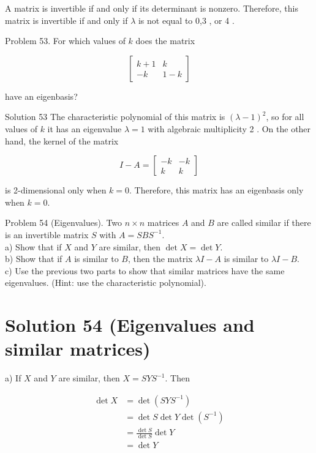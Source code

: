 \documentclass[10pt]{article}
\begin{document}
A matrix is invertible if and only if its determinant is nonzero. Therefore, this matrix is invertible if and only if $\lambda$ is not equal to 0,3 , or 4 .

Problem 53. For which values of $k$ does the matrix

$$
\left[\begin{array}{cc}
k+1 & k \\
-k & 1-k
\end{array}\right]
$$

have an eigenbasis?

Solution 53 The characteristic polynomial of this matrix is $(\lambda-1)^{2}$, so for all values of $k$ it has an eigenvalue $\lambda=1$ with algebraic multiplicity 2 . On the other hand, the kernel of the matrix

$$
I-A=\left[\begin{array}{cc}
-k & -k \\
k & k
\end{array}\right]
$$

is 2-dimensional only when $k=0$. Therefore, this matrix has an eigenbasis only when $k=0$.

Problem 54 (Eigenvalues). Two $n \times n$ matrices $A$ and $B$ are called similar if there is an invertible matrix $S$ with $A=S B S^{-1}$.\\
a) Show that if $X$ and $Y$ are similar, then $\operatorname{det} X=\operatorname{det} Y$.\\
b) Show that if $A$ is similar to $B$, then the matrix $\lambda I-A$ is similar to $\lambda I-B$.\\
c) Use the previous two parts to show that similar matrices have the same eigenvalues. (Hint: use the characteristic polynomial).

\section*{Solution 54 (Eigenvalues and similar matrices)}
a) If $X$ and $Y$ are similar, then $X=S Y S^{-1}$. Then

$$
\begin{aligned}
\operatorname{det} X & =\operatorname{det}\left(S Y S^{-1}\right) \\
& =\operatorname{det} S \operatorname{det} Y \operatorname{det}\left(S^{-1}\right) \\
& =\frac{\operatorname{det} S}{\operatorname{det} S} \operatorname{det} Y \\
& =\operatorname{det} Y
\end{aligned}
$$
\end{document}
